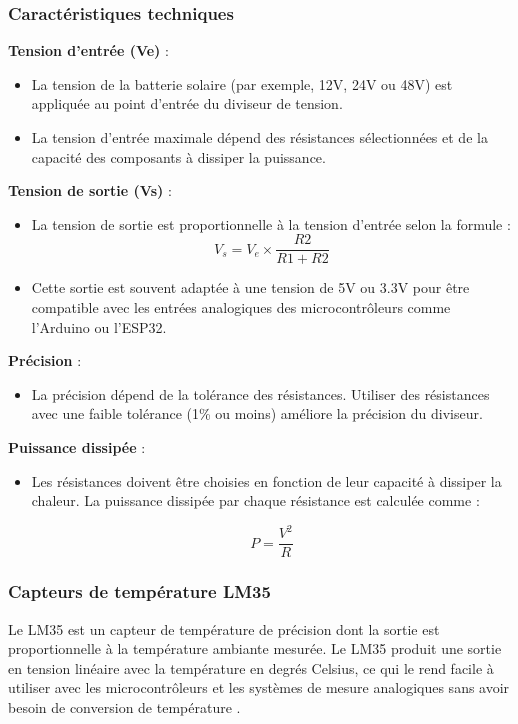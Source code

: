\subsubsection*{Caractéristiques techniques}

\textbf{Tension d'entrée (Ve)} :
\begin{itemize}
	\item La tension de la batterie solaire (par exemple, 12V, 24V ou 48V) est appliquée au point d'entrée du diviseur de tension.
	\item La tension d'entrée maximale dépend des résistances sélectionnées et de la capacité des composants à dissiper la puissance.
\end{itemize}

\textbf{Tension de sortie (Vs)} :
\begin{itemize}
	\item La tension de sortie est proportionnelle à la tension d'entrée selon la formule :
	\begin{equation}
		V_{s} = V_{e} \times \frac{R2}{R1 + R2}
	\end{equation}
	\item Cette sortie est souvent adaptée à une tension de 5V ou 3.3V pour être compatible avec les entrées analogiques des microcontrôleurs comme l'Arduino ou l'ESP32.
\end{itemize}

\textbf{Précision} :
\begin{itemize}
	\item La précision dépend de la tolérance des résistances. Utiliser des résistances avec une faible tolérance (1\% ou moins) améliore la précision du diviseur.
\end{itemize}

\textbf{Puissance dissipée} :
\begin{itemize}
	\item Les résistances doivent être choisies en fonction de leur capacité à dissiper la chaleur. La puissance dissipée par chaque résistance est calculée comme :

	
	\begin{equation}
		P = \frac{V^2}{R}
	\end{equation}
\end{itemize}

\subsubsection{Capteurs de température LM35}
Le LM35 est un capteur de température de précision dont la sortie est proportionnelle à la température ambiante mesurée. Le LM35 produit une sortie en tension linéaire avec la température en degrés Celsius, ce qui le rend facile à utiliser avec les microcontrôleurs et les systèmes de mesure analogiques sans avoir besoin de conversion de température  \cite{3}.

